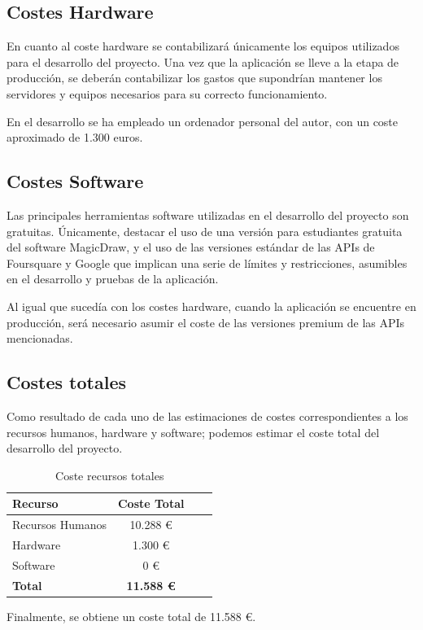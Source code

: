 \subsection{Costes Hardware}
En cuanto al coste hardware se contabilizará únicamente los equipos utilizados para el desarrollo del proyecto. Una vez que la aplicación se lleve a la etapa de producción, se deberán contabilizar los gastos que supondrían mantener los servidores y equipos necesarios para su correcto funcionamiento.

En el desarrollo se ha empleado un ordenador personal del autor, con un coste aproximado de 1.300 euros.


\subsection{Costes Software}
Las principales herramientas software utilizadas en el desarrollo del proyecto son gratuitas. Únicamente, destacar el uso de una versión para estudiantes gratuita del software MagicDraw, y el uso de las versiones estándar de las APIs de Foursquare y Google que implican una serie de límites y restricciones, asumibles en el desarrollo y pruebas de la aplicación. 

Al igual que sucedía con los costes hardware, cuando la aplicación se encuentre en producción, será necesario asumir el coste de las versiones premium de las APIs mencionadas.


\subsection{Costes totales}
Como resultado de cada uno de las estimaciones de costes correspondientes a los recursos humanos, hardware y software; podemos estimar el coste total del desarrollo del proyecto.

\begin{table}[H]
\centering
\begin{tabular}{|l|c|c|c|}
\hline
\textbf{Recurso} & \textbf{Coste Total} \\ \hline
Recursos Humanos &  10.288 € \\ \hline
Hardware & 1.300 €  \\ \hline
Software & 0 €  \\ \hline
\textbf{Total} & \textbf{11.588 €} \\ \hline
\end{tabular}
\caption{Coste recursos totales}
\end{table}

Finalmente, se obtiene un coste total de 11.588 €.
